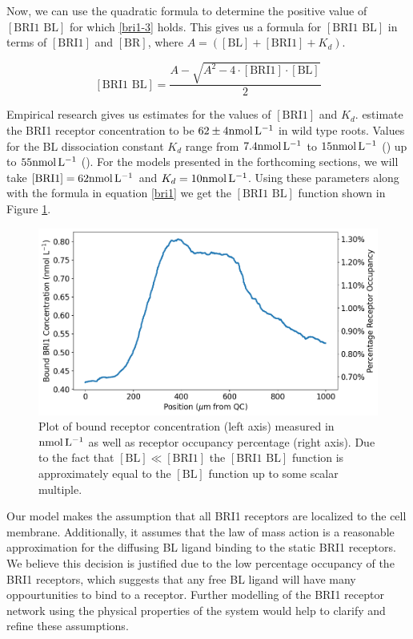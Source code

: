 Now, we can use the quadratic formula to determine the positive value of $[\text{BRI1 BL}]$ for which \eqref{bri1-3} holds. This gives us a formula for $[\text{BRI1 BL}]$ in terms of $[\text{BRI1}]$ and $[\text{BR}]$, where $A = ([\text{BL}] + [\text{BRI1}] + K_{d})$.

\begin{equation}
\label{bri1}
[\text{BRI1 BL}] = \frac{A - \sqrt{A^{2} - 4 \cdot [\text{BRI1}] \cdot [\text{BL}]}}{2}
\end{equation}

Empirical research gives us estimates for the values of $[\text{BRI1}]$ and $K_{d}$. \cite{vanesse2012} estimate the BRI1 receptor concentration to be $62 \pm 4 \nm$ in wild type roots. Values for the BL dissociation constant $K_{d}$ range from $7.4 \nm$ to $15 \nm$ (\cite{wang2001}) up to $55 \nm$ (\cite{cano-delgado2004}). For the models presented in the forthcoming sections, we will take $[\text{BRI1}] = 62 \nm$  and $K_{d} = 10\nm$. Using these parameters along with the formula in equation \eqref{bri1} we get the $[\text{BRI1 BL}]$ function shown in Figure \ref{fig:bri1-function}.

\begin{figure}
    \centering
    \includegraphics[width=13cm]{img/bri1-function.png}
    \caption{Plot of bound receptor concentration (left axis) measured in $\nm$ as well as receptor occupancy percentage (right axis). Due to the fact that $[\text{BL}] \ll [\text{BRI1}]$ the $[\text{BRI1 BL}]$ function is approximately equal to the $[\text{BL}]$ function up to some scalar multiple. }
    \label{fig:bri1-function}
\end{figure}


\medskip

Our model makes the assumption that all BRI1 receptors are localized to the cell membrane. Additionally, it assumes that the law of mass action is a reasonable approximation for the diffusing BL ligand binding to the static BRI1 receptors. We believe this decision is justified due to the low percentage occupancy of the BRI1 receptors, which suggests that any free BL ligand will have many oppourtunities to bind to a receptor. Further modelling of the BRI1 receptor network using the physical properties of the system would help to clarify and refine these assumptions.


